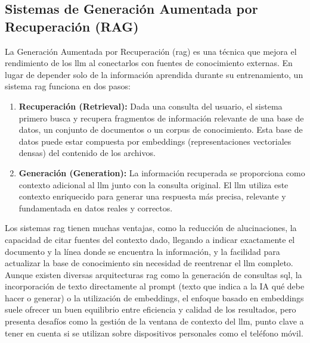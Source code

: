\subsection{Sistemas de Generación Aumentada por Recuperación (RAG)}
La Generación Aumentada por Recuperación (\gls{rag}) es una técnica que mejora el rendimiento de los \gls{llm} al conectarlos con fuentes de conocimiento externas. En lugar de depender solo de la información aprendida durante su entrenamiento, un sistema \gls{rag} funciona en dos pasos:
\begin{enumerate}
    \item \textbf{Recuperación (Retrieval):} Dada una consulta del usuario, el sistema primero busca y recupera fragmentos de información relevante de una base de datos, un conjunto de documentos o un corpus de conocimiento. Esta base de datos puede estar compuesta por embeddings (representaciones vectoriales densas) del contenido de los archivos.
    \item \textbf{Generación (Generation):} La información recuperada se proporciona como contexto adicional al \gls{llm} junto con la consulta original. El \gls{llm} utiliza este contexto enriquecido para generar una respuesta más precisa, relevante y fundamentada en datos reales y correctos.
\end{enumerate}
Los sistemas \gls{rag} tienen muchas ventajas, como la reducción de alucinaciones, la capacidad de citar fuentes del contexto dado, llegando a indicar exactamente el documento y la línea donde se encuentra la información, y la facilidad para actualizar la base de conocimiento sin necesidad de reentrenar el \gls{llm} completo. Aunque existen diversas arquitecturas \gls{rag} como la generación de consultas \gls{sql}, la incorporación de texto directamente al prompt (texto que indica a la IA qué debe hacer o generar) o la utilización de embeddings, el enfoque basado en embeddings suele ofrecer un buen equilibrio entre eficiencia y calidad de los resultados, pero presenta desafíos como la gestión de la ventana de contexto del \gls{llm}, punto clave a tener en cuenta si se utilizan sobre dispositivos personales como el teléfono móvil.

